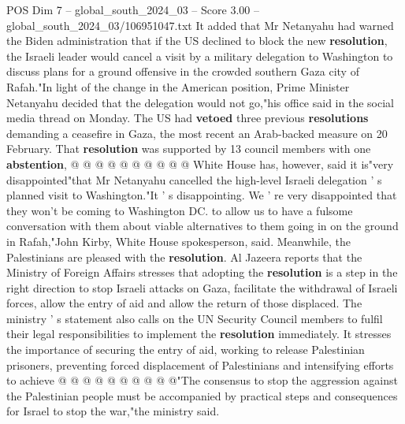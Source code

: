 \begin{textsample}{POS Dim 7 – global\_south\_2024\_03 – Score 3.00 – global\_south\_2024\_03/106951047.txt}
It added that Mr Netanyahu had warned the Biden administration that if the US declined to block the new \textbf{resolution}, the Israeli leader would cancel a visit by a military delegation to Washington to discuss plans for a ground offensive in the crowded southern Gaza city of Rafah."In light of the change in the American position, Prime Minister Netanyahu decided that the delegation would not go,"his office said in the social media thread on Monday.
The US had \textbf{vetoed} three previous \textbf{resolutions} demanding a ceasefire in Gaza, the most recent an Arab-backed measure on 20 February.
That \textbf{resolution} was supported by 13 council members with one \textbf{abstention}, @ @ @ @ @ @ @ @ @ @ White House has, however, said it is"very disappointed"that Mr Netanyahu cancelled the high-level Israeli delegation ' s planned visit to Washington."It ' s disappointing.
We ' re very disappointed that they won't be coming to Washington DC. to allow us to have a fulsome conversation with them about viable alternatives to them going in on the ground in Rafah,"John Kirby, White House spokesperson, said.
Meanwhile, the Palestinians are pleased with the \textbf{resolution}.
Al Jazeera reports that the Ministry of Foreign Affairs stresses that adopting the \textbf{resolution} is a step in the right direction to stop Israeli attacks on Gaza, facilitate the withdrawal of Israeli forces, allow the entry of aid and allow the return of those displaced.
The ministry ' s statement also calls on the UN Security Council members to fulfil their legal responsibilities to implement the \textbf{resolution} immediately.
It stresses the importance of securing the entry of aid, working to release Palestinian prisoners, preventing forced displacement of Palestinians and intensifying efforts to achieve @ @ @ @ @ @ @ @ @ @"The consensus to stop the aggression against the Palestinian people must be accompanied by practical steps and consequences for Israel to stop the war,"the ministry said.

\end{textsample}
